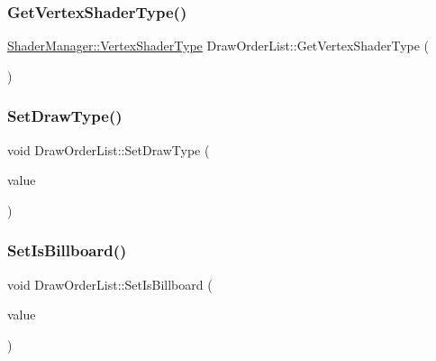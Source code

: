 \mbox{\label{class_draw_order_list_a6533ffbf1cd3f27583e0de8a08648b75}} 
\subsubsection{\texorpdfstring{Get\+Vertex\+Shader\+Type()}{GetVertexShaderType()}}
{\footnotesize\ttfamily \mbox{\hyperlink{class_shader_manager_a9b51e49d70eb3cc58f6d1f3994e8cfbd}{Shader\+Manager\+::\+Vertex\+Shader\+Type}} Draw\+Order\+List\+::\+Get\+Vertex\+Shader\+Type (\begin{DoxyParamCaption}{ }\end{DoxyParamCaption})\hspace{0.3cm}{\ttfamily [inline]}}

\mbox{\label{class_draw_order_list_a5b3ff99f9297293edc057b95d23e8f2d}} 
\subsubsection{\texorpdfstring{Set\+Draw\+Type()}{SetDrawType()}}
{\footnotesize\ttfamily void Draw\+Order\+List\+::\+Set\+Draw\+Type (\begin{DoxyParamCaption}\item[{\mbox{\hyperlink{class_draw_order_list_a6c9b9ceb312c16d399ef355f4f3486bb}{Draw\+Type}}}]{value }\end{DoxyParamCaption})\hspace{0.3cm}{\ttfamily [inline]}}

\mbox{\label{class_draw_order_list_abfb13518e5747d3faa351ca64ec676b2}} 
\subsubsection{\texorpdfstring{Set\+Is\+Billboard()}{SetIsBillboard()}}
{\footnotesize\ttfamily void Draw\+Order\+List\+::\+Set\+Is\+Billboard (\begin{DoxyParamCaption}\item[{bool}]{value }\end{DoxyParamCaption})\hspace{0.3cm}{\ttfamily [inline]}}

